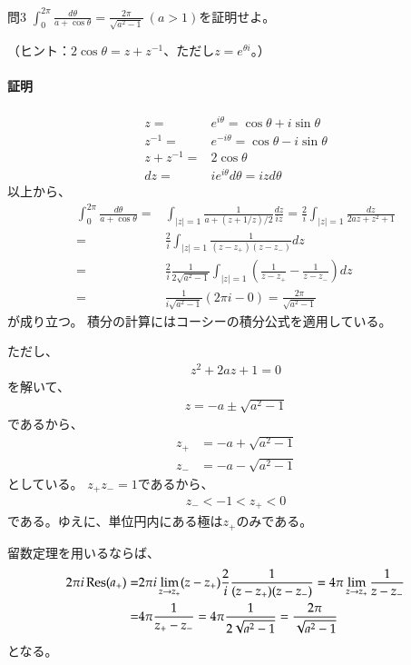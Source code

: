 \newpage
\begin{mysimplebox}{問3}
    $\int_{0}^{2\pi}\frac{d\theta}{a+\cos\theta}=\frac{2\pi}{\sqrt{a^2-1}}\ (a>1)$を証明せよ。

    （ヒント：$2\cos\theta=z+z^{-1}$、ただし$z=e^{\theta i}$。）
\end{mysimplebox}
\paragraph{証明}
\begin{align*}
    z=&e^{i\theta}=\cos\theta+i\sin\theta\\
    z^{-1}=&e^{-i\theta}=\cos\theta-i\sin\theta\\
    z+z^{-1}=&2\cos\theta\\
    dz=&ie^{i\theta}d\theta=izd\theta
\end{align*}
以上から、
\begin{align*}
    \int_{0}^{2\pi}\frac{d\theta}{a+\cos\theta}
    =&\int_{|z|=1}\frac{1}{a+(z+1/z)/2}\frac{dz}{iz}
    =\frac{2}{i}\int_{|z|=1}\frac{dz}{2az+z^2+1}\\
    =&\frac{2}{i}\int_{|z|=1}\frac{1}{(z-z_+)(z-z_-)}dz\\
    =&\frac{2}{i}\frac{1}{2\sqrt{a^2-1}}\int_{|z|=1}\left(\frac{1}{z-z_+}-\frac{1}{z-z_-}\right)dz\\
    =&\frac{1}{i\sqrt{a^2-1}}(2\pi i-0)
    =\frac{2\pi}{\sqrt{a^2-1}}
\end{align*}
が成り立つ。
積分の計算にはコーシーの積分公式を適用している。

ただし、
\begin{align*}
    z^2+2az+1=0
\end{align*}
を解いて、
\begin{align*}
    z=-a\pm\sqrt{a^2-1}
\end{align*}
であるから、
\begin{align*}
    z_+&=-a+\sqrt{a^2-1}\\
    z_-&=-a-\sqrt{a^2-1}
\end{align*}
としている。
$z_+z_-=1$であるから、
\begin{align*}
    z_-<-1<z_+<0
\end{align*}
である。ゆえに、単位円内にある極は$z_+$のみである。

留数定理を用いるならば、
\begin{align*}
    2\pi i\operatorname{Res}(a_+)
    =&2\pi i\lim_{z\to z_+}(z-z_+)\frac{2}{i}\frac{1}{(z-z_+)(z-z_-)}
    =4\pi\lim_{z\to z_+}\frac{1}{z-z_-}\\
    =&4\pi\frac{1}{z_+-z_-}
    =4\pi\frac{1}{2\sqrt{a^2-1}}
    =\frac{2\pi}{\sqrt{a^2-1}}
\end{align*}
となる。

